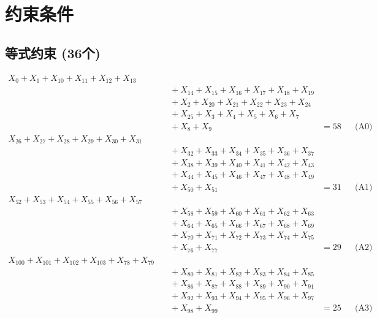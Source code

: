 \documentclass[a4paper,10pt]{article}
\begin{document}
\section{约束条件}

\subsection{等式约束 (36个)}

\allowdisplaybreaks
{\small\begin{align}
X_{0} + X_{1} + X_{10} + X_{11} + X_{12} + X_{13} \\[0.5ex]
&\quad  + X_{14} + X_{15} + X_{16} + X_{17} + X_{18} + X_{19} \\[0.5ex]
&\quad  + X_{2} + X_{20} + X_{21} + X_{22} + X_{23} + X_{24} \\[0.5ex]
&\quad  + X_{25} + X_{3} + X_{4} + X_{5} + X_{6} + X_{7} \\[0.5ex]
&\quad  + X_{8} + X_{9} &= 58 && \text{(A0)} \\
X_{26} + X_{27} + X_{28} + X_{29} + X_{30} + X_{31} \\[0.5ex]
&\quad  + X_{32} + X_{33} + X_{34} + X_{35} + X_{36} + X_{37} \\[0.5ex]
&\quad  + X_{38} + X_{39} + X_{40} + X_{41} + X_{42} + X_{43} \\[0.5ex]
&\quad  + X_{44} + X_{45} + X_{46} + X_{47} + X_{48} + X_{49} \\[0.5ex]
&\quad  + X_{50} + X_{51} &= 31 && \text{(A1)} \\
X_{52} + X_{53} + X_{54} + X_{55} + X_{56} + X_{57} \\[0.5ex]
&\quad  + X_{58} + X_{59} + X_{60} + X_{61} + X_{62} + X_{63} \\[0.5ex]
&\quad  + X_{64} + X_{65} + X_{66} + X_{67} + X_{68} + X_{69} \\[0.5ex]
&\quad  + X_{70} + X_{71} + X_{72} + X_{73} + X_{74} + X_{75} \\[0.5ex]
&\quad  + X_{76} + X_{77} &= 29 && \text{(A2)} \\
X_{100} + X_{101} + X_{102} + X_{103} + X_{78} + X_{79} \\[0.5ex]
&\quad  + X_{80} + X_{81} + X_{82} + X_{83} + X_{84} + X_{85} \\[0.5ex]
&\quad  + X_{86} + X_{87} + X_{88} + X_{89} + X_{90} + X_{91} \\[0.5ex]
&\quad  + X_{92} + X_{93} + X_{94} + X_{95} + X_{96} + X_{97} \\[0.5ex]
&\quad  + X_{98} + X_{99} &= 25 && \text{(A3)} \\

\end{align}}
\end{document}
